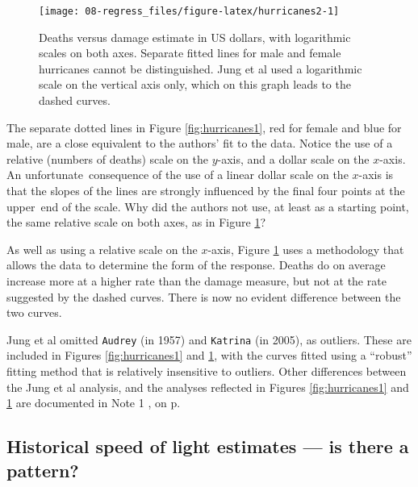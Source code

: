 \documentclass[
  10ptls,
  b5paper]{book}
\begin{document}
\begin{figure}[H]

{\centering \texttt{[image: 08-regress\_files/figure-latex/hurricanes2-1]} 

}

\caption{Deaths versus damage estimate in US dollars, with logarithmic scales
               on both axes. Separate fitted lines for male and female
               hurricanes cannot be distinguished. Jung et al used a 
               logarithmic scale on the vertical axis only, which on
               this graph leads to the dashed curves.}\label{fig:hurricanes2}
\end{figure}

The separate dotted lines in Figure \ref{fig:hurricanes1}, red for female and blue for male, are a close equivalent to the authors' fit to the data. Notice the use of a relative (numbers of deaths) scale on the \(y\)-axis, and a dollar scale on the \(x\)-axis. An unfortunate~consequence of the use of a linear dollar scale on the \(x\)-axis is that the slopes of the lines are strongly influenced by the final four points at the upper~end of the scale. Why did the authors not use, at least as a starting point, the same relative scale on both axes, as in Figure \ref{fig:hurricanes2}?

As well as using a relative scale on the \(x\)-axis, Figure \ref{fig:hurricanes2} uses a methodology that allows the data to determine the form of the response. Deaths do on average increase more at a higher rate than the damage measure, but not at the rate suggested by the dashed curves. There is now no evident difference between the two curves.

Jung et al omitted \texttt{Audrey} (in 1957) and \texttt{Katrina} (in 2005), as outliers. These are included in Figures \ref{fig:hurricanes1} and \ref{fig:hurricanes2}, with the curves fitted using a ``robust'' fitting method that is relatively insensitive to outliers. Other differences between the Jung et al analysis, and the analyses reflected in Figures \ref{fig:hurricanes1} and \ref{fig:hurricanes2} are documented in Note 1 , on p.~\pageref{hurricanes}

\hypertarget{historical-speed-of-light-estimates-is-there-a-pattern}{%
\subsection*{Historical speed of light estimates --- is there a pattern?}\label{historical-speed-of-light-estimates-is-there-a-pattern}}
\end{document}
